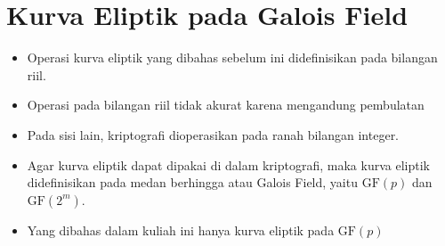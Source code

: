 \documentclass{article}
\begin{document}

\section*{Kurva Eliptik pada Galois Field}

\begin{itemize}
    \item Operasi kurva eliptik yang dibahas sebelum ini didefinisikan pada bilangan riil.
    \item Operasi pada bilangan riil tidak akurat karena mengandung pembulatan
    \item Pada sisi lain, kriptografi dioperasikan pada ranah bilangan integer.
    \item Agar kurva eliptik dapat dipakai di dalam kriptografi, maka kurva eliptik didefinisikan pada medan berhingga atau Galois Field, yaitu $\text{GF}(p)$ dan $\text{GF}(2^m)$.
    \item Yang dibahas dalam kuliah ini hanya kurva eliptik pada $\text{GF}(p)$
\end{itemize}
\end{document}
